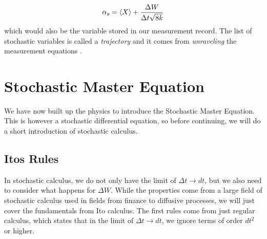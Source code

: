 \begin{equation}
    \alpha_s = \expval{X} + \frac{\Delta W}{\Delta t \sqrt{8k}}
\end{equation}
which would also be the variable stored in our measurement record. The list of stochastic variables is called a \textit{trajectory} and it comes from \textit{unraveling} the measurement equations \cite{jacobs_straightforward_2006}.

\section{Stochastic Master Equation}
We have now built up the physics to introduce the Stochastic Master Equation. This is however a stochastic differential equation, so before continuing, we will do a short introduction of stochastic calculus.  

\subsection{Itos Rules}
In stochastic calculus, we do not only have the limit of $\Delta t \to dt$, but we also need to consider what happens for $\Delta W$. While the properties come from a large field of stochastic calculus used in fields from finance to diffusive processes, we will just cover the fundamentals from Ito calculus. The first rules come from just regular calculus, which states that in the limit of $\Delta t \to dt$, we ignore terms of order $dt^2$ or higher. 

